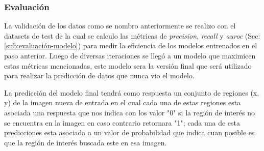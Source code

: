 

\subsubsection*{Evaluación}

La validación de los datos como se nombro anteriormente se realizo con el datasets de test de la cual se calculo las métricas de \textit{precision}, \textit{recall} y \textit{auroc} (Sec:\ref{sub:evaluación-modelo}) para medir la eficiencia de los  modelos entrenados en el paso anterior. Luego de diversas iteraciones se llegó a un modelo que maximicen estas métricas mencionadas, este modelo sera la versión final que será utilizado para realizar la predicción de datos que nunca vio el modelo.

La predicción del modelo final tendrá como respuesta un conjunto de regiones (x, y) de la imagen nueva de entrada en el cual cada una de estas regiones esta asociada una respuesta que nos indica con los valor "0" si la región de interés no se encuentra en la imagen en caso contrario  retornara "1"; cada una de esta predicciones esta asociada a un valor de probabilidad que indica cuan posible es que la región de interés buscada este en esa imagen.